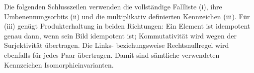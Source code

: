 Die folgenden Schlusszeilen verwenden die vollständige Fallliste (i), ihre
Umbenennungsorbits (ii) und die multiplikativ definierten Kennzeichen (iii).
Für (iii) genügt Produkterhaltung in beiden Richtungen: Ein Element ist
idempotent genau dann, wenn sein Bild idempotent ist; Kommutativität wird
wegen der Surjektivität übertragen. Die Links- beziehungsweise Rechtsnullregel
wird ebenfalls für jedes Paar übertragen. Damit sind sämtliche verwendeten
Kennzeichen Isomorphieinvarianten.
\begin{tabproofwide}
\end{tabproofwide}
